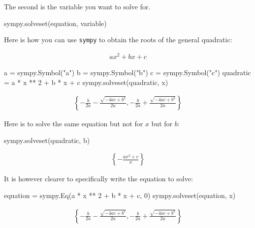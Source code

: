 The second is the variable you want to solve for.

\begin{api}
sympy.solveset(equation, variable)
\end{api}


Here is how you can use \texttt{sympy} to obtain the roots of the general quadratic:

\begin{equation*}
\begin{split}
a x ^ 2 + bx + c
\end{split}
\end{equation*}



\begin{pyin}
a = sympy.Symbol("a")
b = sympy.Symbol("b")
c = sympy.Symbol("c")
quadratic = a * x ** 2 + b * x + c
sympy.solveset(quadratic, x)
\end{pyin}




\begin{equation*}
\begin{split}\displaystyle \left\{- \frac{b}{2 a} - \frac{\sqrt{- 4 a c + b^{2}}}{2 a}, - \frac{b}{2 a} + \frac{\sqrt{- 4 a c + b^{2}}}{2 a}\right\}\end{split}
\end{equation*}




Here is to solve the same equation but not for \(x\) but for
\(b\):




\begin{pyin}
sympy.solveset(quadratic, b)
\end{pyin}




\begin{equation*}
\begin{split}\displaystyle \left\{- \frac{a x^{2} + c}{x}\right\}\end{split}
\end{equation*}

It is however clearer to specifically write the equation to solve:

\begin{pyin}
equation = sympy.Eq(a * x ** 2 + b * x + c, 0)
sympy.solveset(equation, x)
\end{pyin}




\begin{equation*}
\begin{split}\displaystyle \left\{- \frac{b}{2 a} - \frac{\sqrt{- 4 a c + b^{2}}}{2 a}, - \frac{b}{2 a} + \frac{\sqrt{- 4 a c + b^{2}}}{2 a}\right\}\end{split}
\end{equation*}




